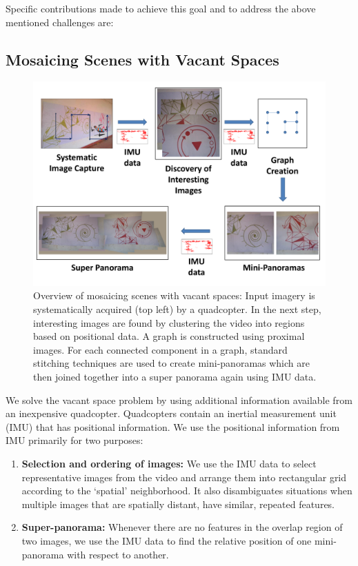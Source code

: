 Specific contributions made to achieve this goal and to address the above
mentioned challenges are:\\

\subsection{Mosaicing Scenes with Vacant Spaces}
\begin{figure}[h!]
	\centering
	\includegraphics[width=0.98\linewidth]{figures/vacantSpaces/Workflow}
	\caption[Workflow]{ Overview of mosaicing scenes with vacant spaces: Input
	imagery is systematically acquired (top left) by a quadcopter.  In the next
    step, interesting images are found by clustering the video into
    regions based on positional data.  A graph is constructed using
    proximal images. For each connected component in a graph, standard
    stitching techniques are used to create mini-panoramas which are
    then joined together into a super panorama 
    again using IMU data.}
    \label{fig:vaccantSpaces_workflow} 
  \end{figure}
  
  We solve the vacant space problem by using additional information
  available from an inexpensive quadcopter.  Quadcopters contain an inertial
measurement unit (IMU) that has positional information. We use the positional
information from IMU primarily for two purposes:
\begin{enumerate}
\item \textbf{Selection and ordering of images:}
We use the IMU data to select representative images from the video and arrange
them into rectangular grid according to the `spatial' neighborhood. It also
  disambiguates situations when multiple images that are spatially distant,
  have similar, repeated features.

\item \textbf{Super-panorama:} Whenever there are no features in
  the overlap region of two images, we use the IMU data to find the
  relative position of one mini-panorama with respect to another.
\end{enumerate}

